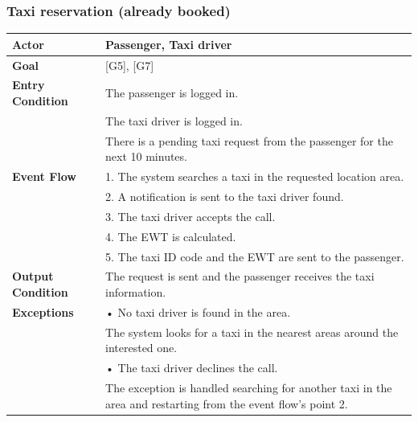 \documentclass{article}
\begin{document}
\subsubsection{Taxi reservation (already booked)}
\begin{tabular}{| l | p{8cm} |}
\hline
\textbf{Actor}      &       Passenger, Taxi driver \\
\hline
\textbf{Goal}       &       [G5], [G7]\\
\hline
\textbf{Entry Condition} &  The passenger is logged in.\\&
The taxi driver is logged in.\\&
                            There is a pending taxi request from the passenger for the next 10 minutes.\\
\hline
\textbf{Event Flow}     & 1.	The system searches a taxi in the requested location area.\\&
                                            2.	A notification is sent to the taxi driver found.\\&
                                            3.	The taxi driver accepts the call.\\&
                                            4.	The EWT is calculated.\\&
                                            5.	The taxi ID code and the EWT are sent to the passenger.
\\
\hline
\textbf{Output Condition} &     The request is sent and the passenger receives the taxi information.\\
\hline
\textbf{Exceptions} &      • No taxi driver is found in the area.\\&
The system looks for a taxi in the nearest areas around the interested one.\\&
• The taxi driver declines the call.\\&

The exception is handled searching for another taxi in the area and restarting from the event flow's point 2.\\
\hline
\end{tabular} 
\end{document}
